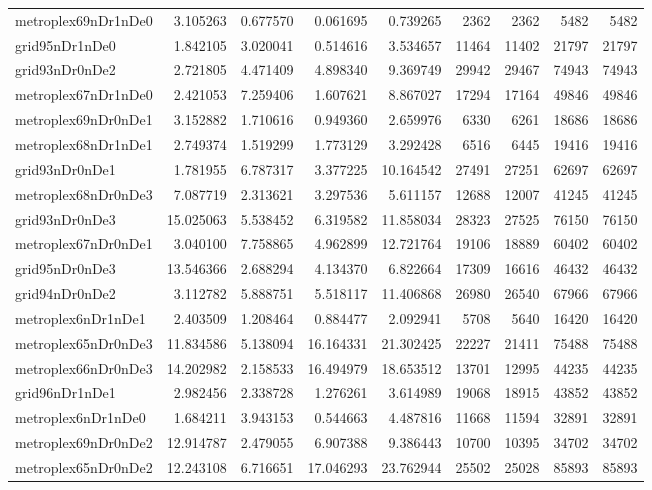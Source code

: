 \begin{longtable}{|l|r|r|r|r|r|r|r|r|}
metroplex69nDr1nDe0 & 3.105263 & 0.677570 & 0.061695 & 0.739265 & 2362 & 2362 & 5482 & 5482 \\
grid95nDr1nDe0 & 1.842105 & 3.020041 & 0.514616 & 3.534657 & 11464 & 11402 & 21797 & 21797 \\
grid93nDr0nDe2 & 2.721805 & 4.471409 & 4.898340 & 9.369749 & 29942 & 29467 & 74943 & 74943 \\
metroplex67nDr1nDe0 & 2.421053 & 7.259406 & 1.607621 & 8.867027 & 17294 & 17164 & 49846 & 49846 \\
metroplex69nDr0nDe1 & 3.152882 & 1.710616 & 0.949360 & 2.659976 & 6330 & 6261 & 18686 & 18686 \\
metroplex68nDr1nDe1 & 2.749374 & 1.519299 & 1.773129 & 3.292428 & 6516 & 6445 & 19416 & 19416 \\
grid93nDr0nDe1 & 1.781955 & 6.787317 & 3.377225 & 10.164542 & 27491 & 27251 & 62697 & 62697 \\
metroplex68nDr0nDe3 & 7.087719 & 2.313621 & 3.297536 & 5.611157 & 12688 & 12007 & 41245 & 41245 \\
grid93nDr0nDe3 & 15.025063 & 5.538452 & 6.319582 & 11.858034 & 28323 & 27525 & 76150 & 76150 \\
metroplex67nDr0nDe1 & 3.040100 & 7.758865 & 4.962899 & 12.721764 & 19106 & 18889 & 60402 & 60402 \\
grid95nDr0nDe3 & 13.546366 & 2.688294 & 4.134370 & 6.822664 & 17309 & 16616 & 46432 & 46432 \\
grid94nDr0nDe2 & 3.112782 & 5.888751 & 5.518117 & 11.406868 & 26980 & 26540 & 67966 & 67966 \\
metroplex6nDr1nDe1 & 2.403509 & 1.208464 & 0.884477 & 2.092941 & 5708 & 5640 & 16420 & 16420 \\
metroplex65nDr0nDe3 & 11.834586 & 5.138094 & 16.164331 & 21.302425 & 22227 & 21411 & 75488 & 75488 \\
metroplex66nDr0nDe3 & 14.202982 & 2.158533 & 16.494979 & 18.653512 & 13701 & 12995 & 44235 & 44235 \\
grid96nDr1nDe1 & 2.982456 & 2.338728 & 1.276261 & 3.614989 & 19068 & 18915 & 43852 & 43852 \\
metroplex6nDr1nDe0 & 1.684211 & 3.943153 & 0.544663 & 4.487816 & 11668 & 11594 & 32891 & 32891 \\
metroplex69nDr0nDe2 & 12.914787 & 2.479055 & 6.907388 & 9.386443 & 10700 & 10395 & 34702 & 34702 \\
metroplex65nDr0nDe2 & 12.243108 & 6.716651 & 17.046293 & 23.762944 & 25502 & 25028 & 85893 & 85893 \\

\end{longtable}
